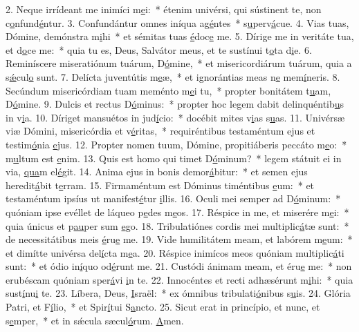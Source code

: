 2. Neque irrídeant me inimíci m\uline{e}i:~* étenim univérsi, qui sústinent te, non c\uline{o}nfund\uline{é}ntur.
3. Confundántur omnes iníqua ag\uline{é}ntes~* s\uline{u}perv\uline{á}cue.
4. Vias tuas, Dómine, demónstra m\uline{i}hi~* et sémitas tuas \uline{é}doc\uline{e} me.
5. Dírige me in veritáte tua, et d\uline{o}ce me:~* quia tu es, Deus, Salvátor meus, et te sustínui t\uline{o}ta d\uline{i}e.
6. Reminíscere miseratiónum tuárum, D\uline{ó}mine,~* et misericordiárum tuárum, quia a s\uline{ǽ}cul\uline{o} sunt.
7. Delícta juventútis m\uline{e}æ,~* et ignorántias meas n\uline{e} mem\uline{í}neris.
8. Secúndum misericórdiam tuam meménto m\uline{e}i tu,~* propter bonitátem t\uline{u}am, D\uline{ó}mine.
9. Dulcis et rectus D\uline{ó}minus:~* propter hoc legem dabit delinquéntib\uline{u}s in v\uline{i}a.
10. Díriget mansuétos in jud\uline{í}cio:~* docébit mites v\uline{i}as s\uline{u}as.
11. Univérsæ viæ Dómini, misericórdia et v\uline{é}ritas,~* requiréntibus testaméntum ejus et testim\uline{ó}nia \uline{e}jus.
12. Propter nomen tuum, Dómine, propitiáberis peccáto m\uline{e}o:~* m\uline{u}ltum est \uline{e}nim.
13. Quis est homo qui timet D\uline{ó}minum?~* legem státuit ei in via, \uline{qua}m el\uline{é}git.
14. Anima ejus in bonis demor\uline{á}bitur:~* et semen ejus heredit\uline{á}bit t\uline{e}rram.
15. Firmaméntum est Dóminus timéntibus \uline{e}um:~* et testaméntum ipsíus ut manifest\uline{é}tur \uline{i}llis.
16. Oculi mei semper ad D\uline{ó}minum:~* quóniam ipse evéllet de láqueo p\uline{e}des m\uline{e}os.
17. Réspice in me, et miserére m\uline{e}i:~* quia únicus et p\uline{au}per sum \uline{e}go.
18. Tribulatiónes cordis mei multiplic\uline{á}tæ sunt:~* de necessitátibus meis \uline{é}ru\uline{e} me.
19. Vide humilitátem meam, et labórem m\uline{e}um:~* et dimítte univérsa del\uline{í}cta m\uline{e}a.
20. Réspice inimícos meos quóniam multiplic\uline{á}ti sunt:~* et ódio in\uline{í}quo od\uline{é}runt me.
21. Custódi ánimam meam, et éru\uline{e} me:~* non erubéscam quóniam sper\uline{á}vi \uline{i}n te.
22. Innocéntes et recti adhæsérunt m\uline{i}hi:~* quia sust\uline{í}nu\uline{i} te.
23. Líbera, Deus, \uline{I}sraël:~* ex ómnibus tribulati\uline{ó}nibus s\uline{u}is.
24. Glória Patri, et F\uline{í}lio,~* et Spir\uline{í}tui S\uline{a}ncto.
25. Sicut erat in princípio, et nunc, et s\uline{e}mper,~* et in sǽcula sæcul\uline{ó}rum. \uline{A}men.
